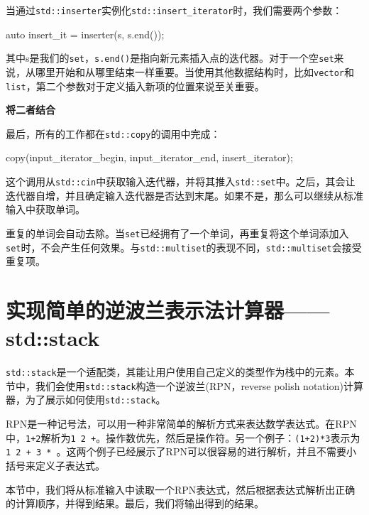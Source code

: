 当通过\texttt{std::inserter}实例化\texttt{std::insert\_iterator}时，我们需要两个参数：

\begin{codebox}[cpp]
auto insert_it = inserter(s, s.end());
\end{codebox}

其中s是我们的\texttt{set}，\texttt{s.end()}是指向新元素插入点的迭代器。对于一个空\texttt{set}来说，从哪里开始和从哪里结束一样重要。当使用其他数据结构时，比如\texttt{vector}和\texttt{list}，第二个参数对于定义插入新项的位置来说至关重要。

\textbf{将二者结合}

最后，所有的工作都在\texttt{std::copy}的调用中完成：

\begin{codebox}[cpp]
copy(input_iterator_begin, input_iterator_end, insert_iterator);
\end{codebox}

这个调用从\texttt{std::cin}中获取输入迭代器，并将其推入\texttt{std::set}中。之后，其会让迭代器自增，并且确定输入迭代器是否达到末尾。如果不是，那么可以继续从标准输入中获取单词。

重复的单词会自动去除。当\texttt{set}已经拥有了一个单词，再重复将这个单词添加入\texttt{set}时，不会产生任何效果。与\texttt{std::multiset}的表现不同，\texttt{std::multiset}会接受重复项。


\section{实现简单的逆波兰表示法计算器——std::stack}

\texttt{std::stack}是一个适配类，其能让用户使用自己定义的类型作为栈中的元素。本节中，我们会使用\texttt{std::stack}构造一个逆波兰(RPN，reverse polish notation)计算器，为了展示如何使用\texttt{std::stack}。

RPN是一种记号法，可以用一种非常简单的解析方式来表达数学表达式。在RPN中，\texttt{1+2}解析为\texttt{1 2 +}。操作数优先，然后是操作符。另一个例子：\texttt{(1+2)*3}表示为\texttt{1 2 + 3 * }。这两个例子已经展示了RPN可以很容易的进行解析，并且不需要小括号来定义子表达式。



本节中，我们将从标准输入中读取一个RPN表达式，然后根据表达式解析出正确的计算顺序，并得到结果。最后，我们将输出得到的结果。

